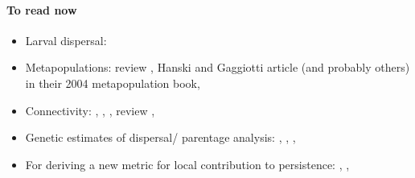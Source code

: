 \documentclass[12pt, oneside]{article}   	%
\begin{document}
\paragraph*{To read now}
\begin{itemize}
\item Larval dispersal: \cite{buston2013marine}
\item Metapopulations: review \cite{hanski1998metapopulation}, Hanski and Gaggiotti article (and probably others) in their 2004 metapopulation book, \cite{puckett2016metapopulation}
\item Connectivity: \cite{almany2007local}, \cite{christie2010larval}, \cite{cowen_scaling_2006}, review \cite{jones2009larval}, \cite{selkoe2011marine}
\item Genetic estimates of dispersal/ parentage analysis: \cite{broquet2009molecular}, \cite{jones2010practical}, \cite{manel2003landscape}, \cite{christie2017disentangling}
\item For deriving a new metric for local contribution to persistence: \cite{botsford_connectivity_2009}, \cite{botsford2009sustainability}, \cite{white_population_2010}
\end{itemize}
\end{document}
